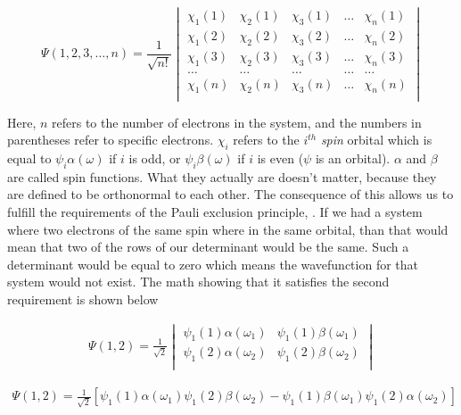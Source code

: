 \documentclass[12pt]{report}
\begin{document}
\begin{equation}
\label{eq:slate_det}
\Psi(1, 2, 3, \ldots, n) =
\frac{1}{\sqrt{n!}}
\begin{vmatrix}
\chi_{1}(1)		&	\chi_{2}(1)		&	\chi_{3}(1)		&	\ldots	&	\chi_{n}(1)		\\
\chi_{1}(2)		&	\chi_{2}(2)		&	\chi_{3}(2)		&	\ldots	&	\chi_{n}(2)		\\
\chi_{1}(3)		&	\chi_{2}(3)		&	\chi_{3}(3)		&	\ldots	&	\chi_{n}(3)		\\
\ldots		&	\ldots		&	\ldots		&	\ldots	&	\ldots		\\
\chi_{1}(n)		&	\chi_{2}(n)		&	\chi_{3}(n)		&	\ldots	&	\chi_{n}(n)		\\

\end{vmatrix}
\end{equation} 

Here, $n$ refers to the number of electrons in the system, and the numbers in parentheses refer to specific electrons. $\chi_{i}$ refers to the $i^{th}$ \textit{spin} orbital which is equal to $\psi_{i}\alpha(\omega)$ if $i$ is odd, or $\psi_{i}\beta(\omega)$ if $i$ is even ($\psi$ is an orbital). $\alpha$ and $\beta$ are called spin functions. What they actually are doesn't matter, because they are defined to be orthonormal to each other. The consequence of this allows us to fulfill the requirements of the Pauli exclusion principle, . If we had a system where two electrons of the same spin where in the same orbital, than that would mean that two of the rows of our determinant would be the same. Such a determinant would be equal to zero which means the wavefunction for that system would not exist. The math showing that it satisfies the second requirement is shown below

\begin{align}
\label{eq:pauli_2t_1}
\Psi(1,2) =
\frac{1}{\sqrt{2}}
\begin{vmatrix}
\psi_{1}(1)\alpha(\omega_{1})		&	\psi_{1}(1)\beta(\omega_{1})		\\
\psi_{1}(2)\alpha(\omega_{2})		&	\psi_{1}(2)\beta(\omega_{2})		\\
\end{vmatrix}
\end{align}

\begin{align}
\label{eq:pauli_2t_2}
\Psi(1,2) =
\frac{1}{\sqrt{2}}
\left[
\psi_{1}(1)\alpha(\omega_{1})\psi_{1}(2)\beta(\omega_{2}) -
\psi_{1}(1)\beta(\omega_{1})\psi_{1}(2)\alpha(\omega_{2})
\right]
\end{align}
\end{document}
